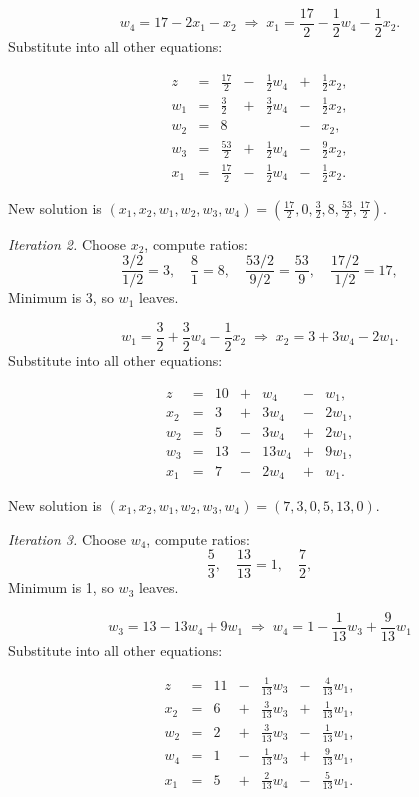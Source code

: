 \documentclass[11pt]{article}
\begin{document}
\begin{description}
\[
w_4 = 17 - 2x_1 - x_2
\;\Longrightarrow\;
x_1 = \frac{17}{2} - \frac{1}{2}w_4 - \frac{1}{2}x_2.
\]
Substitute into all other equations:

\[
\begin{array}{rcrcrcrcr|r}
z & = & \frac{17}{2} & - & \frac{1}{2}w_4 & + & \frac{1}{2}x_2, \\\hline
w_1 & = & \frac{3}{2} & + & \frac{3}{2}w_4 & - & \frac{1}{2}x_2, \\
w_2 & = & 8 & & & - & x_2, \\
w_3 & = & \frac{53}{2} & + & \frac{1}{2}w_4 & - & \frac{9}{2}x_2, \\
x_1 & = & \frac{17}{2} & - & \frac{1}{2}w_4 & - & \frac{1}{2}x_2.
\end{array}
\]

New solution is \((x_1,x_2,w_1,w_2,w_3,w_4)=(\frac{17}{2},0,\frac{3}{2},8,\frac{53}{2},\frac{17}{2})\).

\textit{Iteration 2.} Choose \(x_2\), compute ratios:
\[
\frac{3/2}{1/2}=3,\quad
\frac{8}{1}=8,\quad
\frac{53/2}{9/2}=\frac{53}{9},\quad
\frac{17/2}{1/2}=17,
\]
Minimum is 3, so \(w_1\) leaves.

\[
w_1 = \frac{3}{2} + \frac{3}{2}w_4 - \frac{1}{2}x_2
\;\Longrightarrow\;
x_2 = 3 + 3w_4 - 2w_1.
\]
Substitute into all other equations:

\[
\begin{array}{rcrcrcrcr|r}
z & = & 10 & + & w_4 & - & w_1, \\\hline
x_2 & = & 3 & + & 3w_4 & - & 2w_1, \\
w_2 & = & 5 & - & 3w_4 & + & 2w_1, \\
w_3 & = & 13 & - & 13w_4 & + & 9w_1, \\
x_1 & = & 7 & - & 2w_4 & + & w_1.
\end{array}
\]

New solution is \((x_1,x_2,w_1,w_2,w_3,w_4)=(7,3,0,5,13,0)\).

\textit{Iteration 3.} Choose \(w_4\), compute ratios:
\[
\frac{5}{3},\quad
\frac{13}{13}=1,\quad
\frac{7}{2},
\]
Minimum is 1, so \(w_3\) leaves.

\[
w_3 = 13 - 13w_4 + 9w_1
\;\Longrightarrow\;
w_4 = 1 - \frac{1}{13}w_3 + \frac{9}{13}w_1
\]
Substitute into all other equations:

\[
\begin{array}{rcrcrcrcr|r}
z & = & 11 & - & \frac{1}{13}w_3 & - & \frac{4}{13}w_1, \\\hline
x_2 & = & 6 & + & \frac{3}{13}w_3 & + & \frac{1}{13}w_1, \\
w_2 & = & 2 & + & \frac{3}{13}w_3 & - & \frac{1}{13}w_1, \\
w_4 & = & 1 & - & \frac{1}{13}w_3 & + & \frac{9}{13}w_1, \\
x_1 & = & 5 & + & \frac{2}{13}w_4 & - & \frac{5}{13}w_1.
\end{array}
\]


\end{description}
\end{document}
